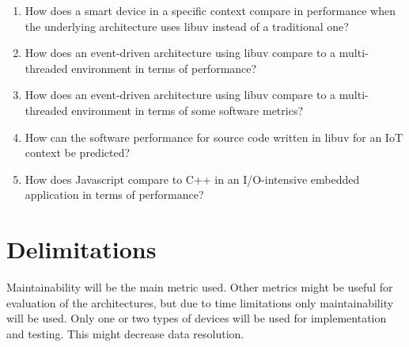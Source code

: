 \begin{enumerate}
    \item How does a smart device in a specific context compare in performance
        when the underlying architecture uses libuv instead of a traditional
        one?

    \item How does an event-driven architecture using libuv compare to a
        multi-threaded environment in terms of performance?

    \item How does an event-driven architecture using libuv compare to a
        multi-threaded environment in terms of some software metrics?

    \item How can the software performance for source code written in libuv for
        an IoT context be predicted?

    \item How does Javascript compare to C++ in an I/O-intensive embedded
        application in terms of performance?
\end{enumerate}

\section{Delimitations}
\label{sec:delimitations}

Maintainability will be the main metric used. Other metrics might be useful for
evaluation of the architectures, but due to time limitations only
maintainability will be used. Only one or two types of devices will be used for
implementation and testing. This might decrease data resolution.
